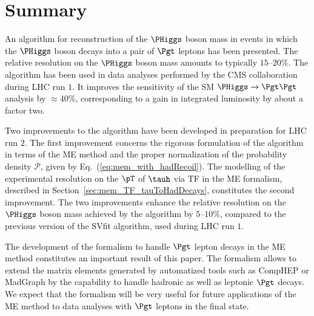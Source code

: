 \section{Summary}
\label{sec:summary}

An algorithm for reconstruction of the $\PHiggs$ boson mass in events
in which the $\PHiggs$ boson decays into a pair of $\Pgt$ leptons has been
presented.
The relative resolution on the $\PHiggs$ boson mass amounts to typically
$15$--$20\%$.
The algorithm has been used in data analyses performed by the CMS
collaboration during LHC run $1$.
It improves the sensitivity of the SM $\PHiggs \to \Pgt\Pgt$ analysis by $\approx 40\%$,
corresponding to a gain in integrated luminosity by about a factor two.

Two improvements to the algorithm have been developed in preparation
for LHC run $2$.
The first improvement concerns the rigorous formulation of the
algorithm in terms of the ME method
and the proper normalization of the probability density 
$\mathcal{P}$, given by Eq.~(\ref{eq:mem_with_hadRecoil}).
The modelling of the experimental resolution on the $\pT$ of $\tauh$ via TF in the ME
formalism, described in Section~\ref{sec:mem_TF_tauToHadDecays}, constitutes the second improvement.
The two improvements enhance the relative resolution on the $\PHiggs$ boson mass
achieved by the algorithm by $5$--$10\%$, 
compared to the previous version of the SVfit algorithm, used during LHC run $1$.

The development of the formalism to handle $\Pgt$ lepton decays
in the ME method constitutes an important result of this paper.
The formalism allows to extend the matrix elements generated by automatized tools such as
CompHEP or MadGraph by the capability to handle hadronic as well as leptonic $\Pgt$ decays.
We expect that the formalism will be very useful for future
applications of the ME method to data analyses with $\Pgt$ leptons in
the final state. 
